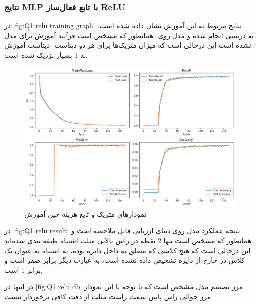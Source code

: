 \documentclass{article}
\begin{document}
\newpage
\subsubsection{نتایج MLP با تابع فعال‌ساز ReLU}

در ‎‎\autoref{fig:Q1 relu training graph}‎ نتایج مربوط به این آموزش نشان داده شده است. همانطور که مشخص است فرآیند آموزش برای مدل ‎ به درستی انجام شده و مدل روی دیتاست آموزش ‎ نشده است این درحالی است که میزان متریک‌ها برای هر دو دیتاست به 1 بسیار نزدیک شده است.

\begin{figure}[H]
    \centering
    \includegraphics[width=0.7\linewidth]{img/Q1_Relu_metrics_graph.png}
    \caption{نمودارهای متریک و تابع هزینه حین آموزش}
    \label{fig:Q1 relu training graph}
\end{figure}

در ‎\autoref{fig:Q1 relu result}‎ نتیجه عملکرد مدل روی دیتای ارزیابی قابل ملاحضه است و همانطور که مشخص است تنها 2 نقطه در راس بالایی مثلث اشتباه طبقه بندی شده‌اند این درحالی است که هیچ کلاسی که متعلق به داخل دایره بوده، به اشتباه به عنوان یک کلاس در خارج از دایره تشخیص داده نشده است، به عبارت دیگر
 برابر صفر است و   برابر 1 است.
 
 در انتها در ‎\autoref{fig:Q1 relu db}‎  مرز تصمیم مدل مشخص است که با توجه با این نمودار مرز حوالی راس پایین سمت راست مثلث از دقت کافی برخوردار نیست.
\end{document}
